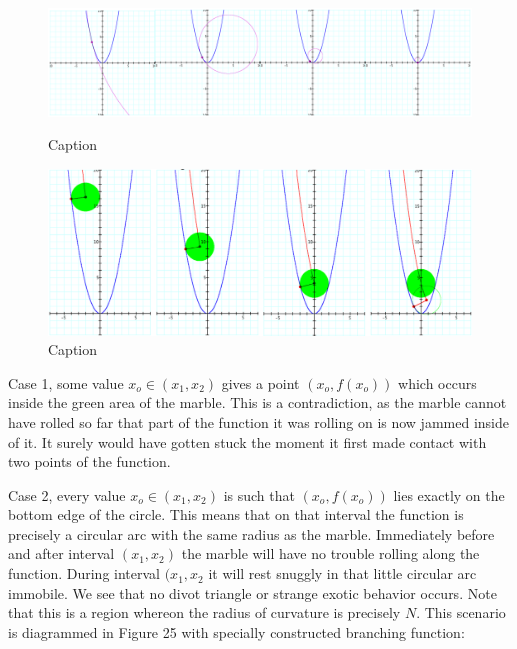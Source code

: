 \begin{figure}[h!]
  \begin{minipage}[b]{\linewidth}
    \centering
    \includegraphics[height=0.2\textheight]{findig-crunch-spots-img/Fig 23.png}
    \caption{Caption}
    \label{fig:fig23}
    \vspace{4ex}
  \end{minipage} %
  \begin{minipage}[b]{\linewidth}
    \centering
    \includegraphics[height=0.2\textheight]{findig-crunch-spots-img/Fig 24.png}
    \caption{Caption}
    \label{fig:fig24}
  \end{minipage} %
\end{figure}

Case 1, some value $x_o \in (x_1, x_2)$ gives a point $(x_o, f(x_o))$ which occurs inside the green area of the marble. This is a contradiction, as the marble cannot have rolled so far that part of the function it was rolling on is now jammed inside of it. It surely would have gotten stuck the moment it first made contact with two points of the function.

Case 2, every value $x_o \in (x_1, x_2)$ is such that $(x_o, f(x_o))$ lies exactly on the bottom edge of the circle. This means that on that interval the function is precisely a circular arc with the same radius as the marble. Immediately before and after interval $(x_1, x_2)$ the marble will have no trouble rolling along the function. During interval $(x_1, x_2$ it will rest snuggly in that little circular arc immobile. We see that no divot triangle or strange exotic behavior occurs. Note that this is a region whereon the radius of curvature is precisely $N$. This scenario is diagrammed in Figure 25 with specially constructed branching function:

